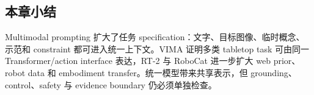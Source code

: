 
\subsection{本章小结}

Multimodal prompting 扩大了任务 specification：文字、目标图像、临时概念、示范和 constraint 都可进入统一上下文。VIMA 证明多类 tabletop task 可由同一 Transformer/action interface 表达，RT-2 与 RoboCat 进一步扩大 web prior、robot data 和 embodiment transfer。统一模型带来共享表示，但 grounding、control、safety 与 evidence boundary 仍必须单独检查。

